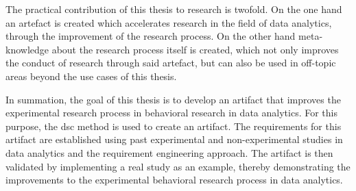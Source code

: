 The practical contribution of this thesis to research is twofold. On the one hand an artefact is created which accelerates research in the field of data analytics, through the improvement of the research process. On the other hand meta-knowledge about the research process itself is created, which not only improves the conduct of research through said artefact, but can also be used in off-topic areas beyond the use cases of this thesis.

In summation, the goal of this thesis is to develop an artifact that improves the experimental research process in behavioral research in data analytics. For this purpose, the \ac{dsc} method is used to create an artifact. The requirements for this artifact are established using past experimental and non-experimental studies in data analytics and the requirement engineering approach. The artifact is then validated by implementing a real study as an example, thereby demonstrating the improvements to the experimental behavioral research process in data analytics.

















